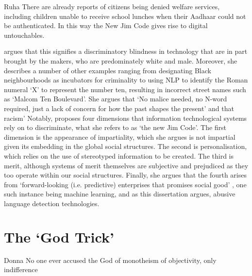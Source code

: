 \begin{citequote}{Ruha \citet[p. 133]{Benjamin:2019}}
  There are already reports of citizens being denied welfare services, including children unable to receive school lunches when their Aadhaar could not be authenticated. In this way the New Jim Code gives rise to digital untouchables.
\end{citequote}

\citet{Benjamin:2019} argues that this signifies a discriminatory blindness in technology that are in part brought by the makers, who are predominately white and male.
Moreover, she describes a number of other examples ranging from designating Black neighbourhoods as incubators for criminality to using NLP to identify the Roman numeral `X' to represent the number ten, resulting in incorrect street names such as `Malcom Ten Boulevard'.
She argues that `No malice needed, no N-word required, just a lack of concern for how the past shapes the present' and that racism' \citep[p. 48]{Benjamin:2019}
Notably, \citet{Benjamin:2019} proposes four dimensions that information technological systems rely on to discriminate, what she refers to as `the new Jim Code'.
The first dimension is the appearance of impartiality, which she argues is not impartial given its embedding in the global social structures.
The second is personalisation, which relies on the use of stereotyped information to be created.
The third is merit, although systems of merit themselves are subjective and prejudiced as they too operate within our social structures.
Finally, she argues that the fourth arises from `forward-looking (i.e. predictive) enterprises that promises social good' \citep[p. 85]{Benjamin:2019}, one such instance being machine learning, and as this dissertation argues, abusive language detection technologies.

\section{The `God Trick'}

\begin{citequote}{Donna \citet{Haraway:1988}}
  No one ever accused the God of monotheism of objectivity, only indifference
\end{citequote}

